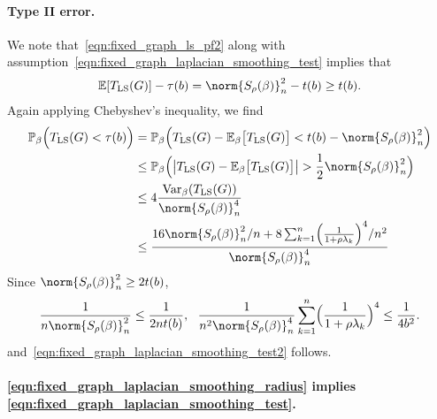 \documentclass{article}
\newcommand{\abs}[1]{\left \lvert #1 \right \rvert}
\newcommand{\Var}{\mathrm{Var}}
\newcommand{\1}{\mathbf{1}}
\newcommand{\Pbb}{\mathbb{P}}
\newcommand{\Ebb}{\mathbb{E}}
\newcommand{\LS}{\mathrm{LS}}
\theoremstyle{alden}
\theoremstyle{aldenthm}
\theoremstyle{definition}
\theoremstyle{remark}
\begin{document}
\paragraph{Type II error.}
We note that~\eqref{eqn:fixed_graph_ls_pf2} along with assumption~\eqref{eqn:fixed_graph_laplacian_smoothing_test} implies that
\begin{equation*}
\mathbb{E}[T_{\LS}(G)] - \tau(b) = \norm{S_{\rho}(\beta)}_n^2 - t(b) \geq t(b).
\end{equation*}
Again applying Chebyshev's inequality, we find
\begin{align*}
\Pbb_{\beta}\Bigl(T_{\LS}(G) < \tau(b)\Bigr) & = \Pbb_{\beta}\Bigl(T_{\LS}(G) -\Ebb_{\beta}\bigl[T_{\LS}(G)\bigr] < t(b) - \norm{S_{\rho}(\beta)}_n^2 \Bigr) \\
& \leq \Pbb_{\beta}\Bigl(\abs{T_{\LS}(G) -\Ebb_{\beta}\bigl[T_{\LS}(G)\bigr]} > \frac{1}{2}\norm{S_{\rho}(\beta)}_n^2  \Bigr) \\
& \leq 4\frac{\Var_{\beta}(T_{\LS}(G))}{\norm{S_{\rho}(\beta)}_n^4} \\
& \leq \frac{16 \norm{S_{\rho}(\beta)}_n^2/n + 8\sum_{k = 1}^{n} \Bigl(\frac{1}{1 + \rho \lambda_k}\Bigr)^4/n^2}{\norm{S_{\rho}(\beta)}_n^4}
\end{align*}
Since $\norm{S_{\rho}(\beta)}_n^2 \geq 2t(b)$,
\begin{equation*}
\frac{1}{n\norm{S_{\rho}(\beta)}_n^2} \leq \frac{1}{2nt(b)},~~ \frac{1}{n^2\norm{S_{\rho}(\beta)}_n^4}\sum_{k = 1}^{n} \Bigl(\frac{1}{1 + \rho \lambda_k}\Bigr)^4 \leq \frac{1}{4b^2}.
\end{equation*}
and~\eqref{eqn:fixed_graph_laplacian_smoothing_test2} follows. 

\paragraph{\eqref{eqn:fixed_graph_laplacian_smoothing_radius} implies \eqref{eqn:fixed_graph_laplacian_smoothing_test}.}
\end{document}
